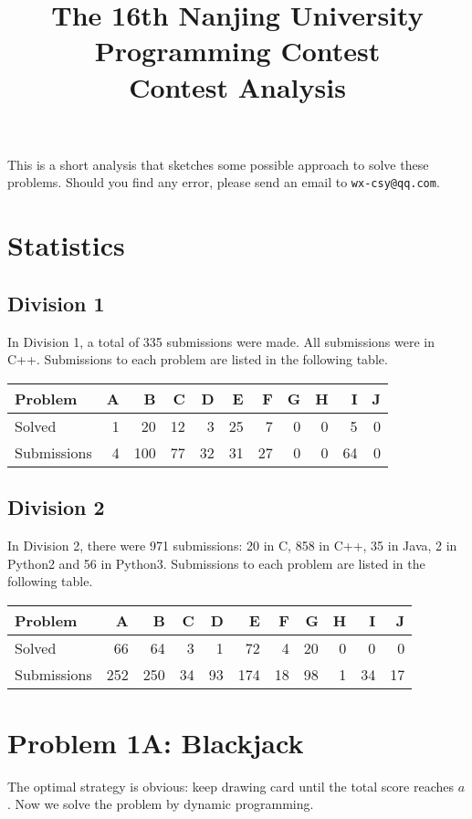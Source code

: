 \documentclass[a4paper,10.5pt,twoside]{article}
\title{\LARGE{The 16th Nanjing University Programming Contest} \\ Contest Analysis}
\begin{document}
\maketitle

This is a short analysis that sketches some possible approach to solve these problems. Should you find any error, please send an email to \texttt{wx-csy@qq.com}.

\section*{Statistics}
\subsection*{Division 1}
In Division 1, a total of 335 submissions were made. All submissions were in C++. Submissions to each problem are listed in the following table.
\begin{table}[h]
\centering
\begin{tabular}{|l|rrrrrrrrrr|}
\hline
Problem & A & B & C & D & E & F & G & H & I & J \\ \hline
Solved & 1 & 20 & 12 & 3 & 25 & 7 & 0 & 0 & 5 & 0 \\
Submissions & 4 & 100 & 77 & 32 & 31 & 27 & 0 & 0 & 64 & 0 \\ \hline
\end{tabular}
\end{table}

\subsection*{Division 2}

In Division 2, there were 971 submissions: 20 in C, 858 in C++, 35 in Java, 2 in Python2 and 56 in Python3. Submissions to each problem are listed in the following table.
\begin{table}[h]
\centering
\begin{tabular}{|l|rrrrrrrrrr|}
\hline
Problem & A & B & C & D & E & F & G & H & I & J \\ \hline
Solved & 66 & 64 & 3 & 1 & 72 & 4 & 20 & 0 & 0 & 0 \\
Submissions & 252 & 250 & 34 & 93 & 174 & 18 & 98 & 1 & 34 & 17 \\ \hline
\end{tabular}

\end{table}

\section*{Problem 1A: Blackjack}
The optimal strategy is obvious: keep drawing card until the total score reaches $a$. Now we solve the problem by dynamic programming.
\end{document}
